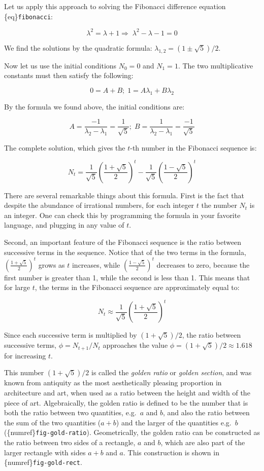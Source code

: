 \documentclass[
  letterpaper,
  DIV=11,
  numbers=noendperiod]{scrreprt}
\begin{document}
Let us apply this approach to solving the Fibonacci difference equation
\{eq\}\texttt{fibonacci}:

\[
\lambda^{2}= \lambda + 1 \Longrightarrow \;  \lambda^2-\lambda-1= 0
\]

We find the solutions by the quadratic formula:
\(\lambda_{1,2} = (1\pm \sqrt 5)/2\).

Now let us use the initial conditions \(N_0 = 0\) and \(N_1 = 1\). The
two multiplicative constants must then satisfy the following:

\[
0 = A + B; \; 1 = A\lambda_1 + B\lambda_2
\]

By the formula we found above, the initial conditions are:

\[
A =  \frac{-1}{\lambda_2 - \lambda_1} =  \frac{1}{\sqrt 5} ; \; B = \frac{1}{\lambda_2 - \lambda_1} = \frac{-1}{\sqrt 5}
\]

The complete solution, which gives the \(t\)-th number in the Fibonacci
sequence is:

\[
N_t =  \frac{1}{\sqrt 5}\left( \frac{1+ \sqrt 5}{2}\right)^t - \frac{1}{\sqrt 5}\left(\frac{1- \sqrt 5}{2}\right)^t
\]

There are several remarkable things about this formula. First is the
fact that despite the abundance of irrational numbers, for each integer
\(t\) the number \(N_t\) is an integer. One can check this by
programming the formula in your favorite language, and plugging in any
value of \(t\).

Second, an important feature of the Fibonacci sequence is the ratio
between successive terms in the sequence. Notice that of the two terms
in the formula, \((\frac{1+ \sqrt 5}{2})^t\) grows as \(t\) increases,
while \((\frac{1- \sqrt 5}{2})^t\) decreases to zero, because the first
number is greater than 1, while the second is less than 1. This means
that for large \(t\), the terms in the Fibonacci sequence are
approximately equal to:

\[
N_t \approx \frac{1}{\sqrt 5}\left( \frac{1+ \sqrt 5}{2}\right)^t
\]

Since each successive term is multiplied by \((1+\sqrt5)/2\), the ratio
between successive terms, \(\phi = N_{t+1}/N_t\) approaches the value
\(\phi=(1+\sqrt5)/2 \approx 1.618\) for increasing \(t\).

This number \((1+\sqrt 5)/2\) is called the \emph{golden ratio} or
\emph{golden section}, and was known from antiquity as the most
aesthetically pleasing proportion in architecture and art, when used as
a ratio between the height and width of the piece of art. Algebraically,
the golden ratio is defined to be the number that is both the ratio
between two quantities, e.g.~\(a\) and \(b\), and also the ratio between
the sum of the two quantities (\(a+b\)) and the larger of the quantities
e.g.~\(b\) (\{numref\}\texttt{fig-gold-ratio}). Geometrically, the
golden ratio can be constructed as the ratio between two sides of a
rectangle, \(a\) and \(b\), which are also part of the larger rectangle
with sides \(a+b\) and \(a\). This construction is shown in
\{numref\}\texttt{fig-gold-rect}.
\end{document}

